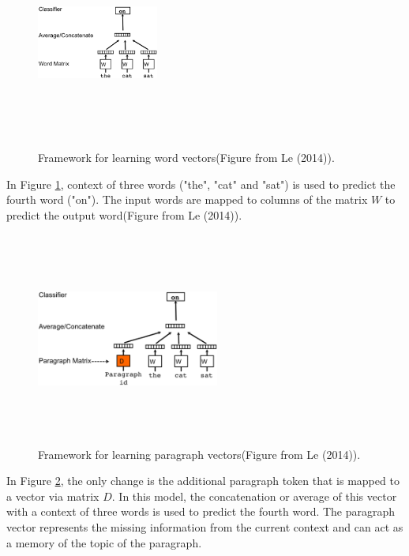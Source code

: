 \documentclass[11pt,a4paper]{article}
\begin{document}
\begin{figure}[ht!]
\centering
\includegraphics[width=40mm, height=70mm]{img/doc2vec_word_vector.eps}
\caption{Framework for learning word vectors(Figure from Le (2014)). \label{fig:word2vec}}
\end{figure}
In Figure \ref{fig:word2vec}, context  of three words ("the", "cat" and "sat") is used to predict the fourth word ("on"). The input words are mapped to columns of the matrix $W$ to predict the output word(Figure from Le (2014)).

\begin{figure}[ht!]
\centering
\includegraphics[width=60mm, height=70mm]{img/doc2vec.eps}
\caption{Framework for learning paragraph vectors(Figure from Le (2014)). \label{fig:doc2vec}}
\end{figure}
In Figure \ref{fig:doc2vec}, the only change is the additional paragraph token that is mapped to a vector via matrix $D$. In this model, the concatenation or average of this vector with a context of three words is used to predict the fourth word. The paragraph vector represents the missing information from the current context and can act as a memory of the topic of the paragraph.
\end{document}
